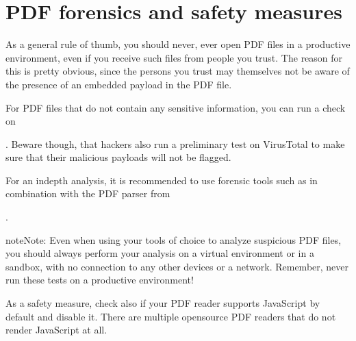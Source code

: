 \documentclass[a4paper,10pt,english,openany,oneside]{sphinxmanual}
\begin{document}
\chapter{PDF forensics and safety measures}
\label{\detokenize{metadata-compression:pdf-forensics-and-safety-measures}}
\sphinxAtStartPar
As a general rule of thumb, you should never, ever open PDF files in a productive environment, even if you receive such files from people you trust. The reason for this is pretty obvious, since the persons you trust may themselves not be aware of the presence of an embedded payload in the PDF file.

\sphinxAtStartPar
For PDF files that do not contain any sensitive information, you can run a check on %
\begin{footnote}[10]\sphinxAtStartFootnote
{}
%
\end{footnote}. Beware though, that hackers also run a preliminary test on VirusTotal to make sure that their malicious payloads will not be flagged.

\sphinxAtStartPar
For an in\sphinxhyphen{}depth analysis, it is recommended to use forensic tools such as  in combination with the PDF parser  from %
\begin{footnote}[11]\sphinxAtStartFootnote
{}
%
\end{footnote}.

\begin{sphinxadmonition}{note}{Note:}
\sphinxAtStartPar
Even when using your tools of choice to analyze suspicious PDF files, you should always perform your analysis on a virtual environment or in a sandbox, with no connection to any other devices or a network. Remember, never run these tests on a productive environment!
\end{sphinxadmonition}

\sphinxAtStartPar
As a safety measure, check also if your PDF reader supports JavaScript by default and disable it. There are multiple open\sphinxhyphen{}source PDF readers that do not render JavaScript at all.

\sphinxstepscope
\end{document}
